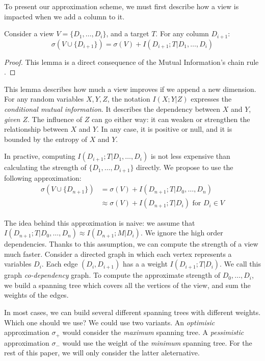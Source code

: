 To present our approximation scheme, we must first describe how a
view is impacted when we add a column to it.

\begin{lemma}\label{lem:chain}
Consider a view $V = \{D_1, \ldots, D_i\}$, and a target $T$.
For any column $D_{i+1}$: 
$$
\sigma(V \cup \{D_{i+1}\}) =  \sigma(V) + I(D_{i+1} ; T | D_1 , \ldots, D_i)
 $$
\end{lemma}
\begin{proof}
This lemma is a direct consequence of the Mutual Information's chain rule
\cite{cover2012elements}.
\end{proof}

This lemma describes how much a view improves if we append a new dimension.
For any random variables $X,Y,Z$, the notation $I(X;Y|Z)$ expresses the
\emph{conditional mutual information}. It describes the dependency between $X$
and $Y$, \emph{given $Z$}. The influence of $Z$ can go either way: it can
weaken or strengthen the relationship between $X$ and $Y$. In any case, it is
positive or null, and it is bounded by the entropy of $X$ and $Y$.

In practive, computing $ I(D_{i+1} ; T | D_1 , \ldots, D_i)$ is not less
expensive than calculating the strength of $\{D_1, \ldots, D_{i+1}\}$ directly.
We propose to use the following approximation:
\[
\begin{split}
    \sigma(V \cup \{D_{n+1}\}) & = \sigma(V)   + I(D_{n+1} ; T | D_0, \ldots, D_{n})\\
                           & \approx \sigma(V) + I(D_{n+1} ; T | D_{i})
\text{ for } D_i \in V
\end{split}
\]

The idea behind this approximation is naive: we assume that $I(D_{n+1} ; T |
D_0, \ldots, D_{n}) \approx I(D_{n+1} ; M | D_{i})$. We ignore the high order
dependencies. Thanks to this assumption, we can compute the strength of a view
much faster.  Consider a directed graph in which each vertex represents a
variables $D_i$. Each edge $(D_i, D_{i+1})$ has a a weight $ I(D_{i+1} ; T |
D_{i})$.  We call this graph \emph{co-dependency} graph.  To compute the
approximate strength of ${D_0, \ldots, D_i}$, we build a spanning tree which
covers all the vertices of the view, and sum the weights of the edges.

In most cases, we can build several different spanning trees with different
weights. Which one should we use? We could use two variants. An
\emph{optimisic} approximation $\sigma_+ $ would consider the \emph{maximum}
spanning tree.  A \emph{pessimistic} approximation $\sigma_- $ would use the
weight of the \emph{minimum} spanning tree. For the rest of this paper, we will
only consider the latter aleternative. 

